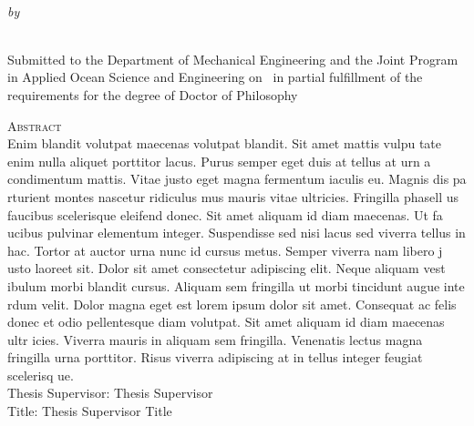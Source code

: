 \begin{center}
{\large \@title} \\
\emph{\footnotesize by} \\
\@author \\
\end{center}

\vspace{-1em}

\begin{center}
\begin{singlespace}
{\parindent0pt
\small
Submitted to the Department of Mechanical Engineering and the Joint Program in Applied Ocean Science and Engineering on \@date ~in partial fulfillment of the requirements for the degree of Doctor of Philosophy}
\end{singlespace}
\end{center}

\begin{singlespace}
{\parindent0pt 
	{\large \textsc{Abstract}} \\ %

	Enim blandit volutpat maecenas volutpat blandit. Sit amet mattis vulpu
	tate enim nulla aliquet porttitor lacus. Purus semper eget duis at tellus at urn
	a condimentum mattis. Vitae justo eget magna fermentum iaculis eu. Magnis dis pa
	rturient montes nascetur ridiculus mus mauris vitae ultricies. Fringilla phasell
	us faucibus scelerisque eleifend donec. Sit amet aliquam id diam maecenas. Ut fa
	ucibus pulvinar elementum integer. Suspendisse sed nisi lacus sed viverra tellus
	 in hac. Tortor at auctor urna nunc id cursus metus. Semper viverra nam libero j
	usto laoreet sit. Dolor sit amet consectetur adipiscing elit. Neque aliquam vest
	ibulum morbi blandit cursus. Aliquam sem fringilla ut morbi tincidunt augue inte
	rdum velit. Dolor magna eget est lorem ipsum dolor sit amet. Consequat ac felis 
	donec et odio pellentesque diam volutpat. Sit amet aliquam id diam maecenas ultr
	icies. Viverra mauris in aliquam sem fringilla. Venenatis lectus magna fringilla
	 urna porttitor. Risus viverra adipiscing at in tellus integer feugiat scelerisq
	ue. \\

	\noindent Thesis Supervisor: Thesis Supervisor \\
	\noindent Title: Thesis Supervisor Title
}
\end{singlespace}

\newpage
\null
\thispagestyle{empty}
\newpage